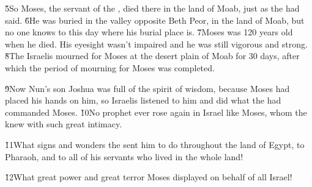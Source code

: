 \v{5}So Moses, the servant of the , died there in the land of Moab, just as the  had said. \v{6}He was buried in the valley opposite Beth Peor, in the land of Moab, but no one knows to this day where his burial place is. \v{7}Moses was 120 years old when he died. His eyesight wasn't impaired and he was still vigorous and strong. \v{8}The Israelis mourned for Moses at the desert plain of Moab for 30 days, after which the period of mourning for Moses was completed.

\v{9}Now Nun's son Joshua was full of the spirit of wisdom, because Moses had placed his hands on him, so Israelis listened to him and did what the  had commanded Moses. \v{10}No prophet ever rose again in Israel like Moses, whom the  knew with such great intimacy.

\v{11}What signs and wonders the  sent him to do throughout the land of Egypt, to Pharaoh, and to all of his servants who lived in the whole land!

\v{12}What great power and great terror Moses displayed on behalf of all Israel!
